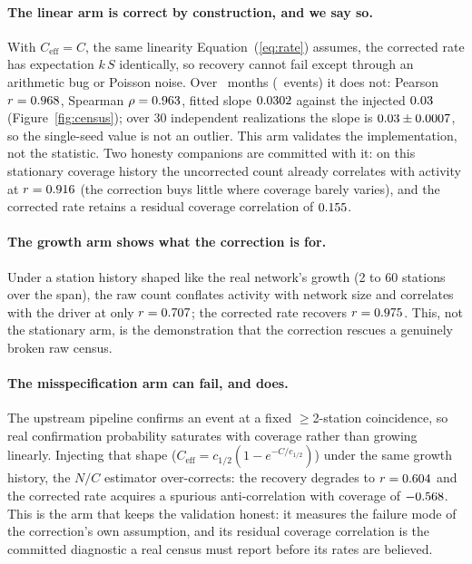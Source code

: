 \documentclass[twocolumn]{aastex631}
\begin{document}
\paragraph{The linear arm is correct by construction, and we say so.} With
$C_\mathrm{eff}=C$, the same linearity Equation~(\ref{eq:rate}) assumes, the corrected rate
has expectation $k\,S$ identically, so recovery cannot fail except through an arithmetic bug or
Poisson noise. Over \ecsSynNperiods\ months (\ecsSynNevents\ events) it does not: Pearson
$r=0.968$, Spearman $\rho=0.963$, fitted slope $0.0302$ against the
injected $0.03$ (Figure~\ref{fig:census}); over 30 independent realizations the slope is
$0.03\pm0.0007$, so the single-seed value is not an outlier. This arm
validates the implementation, not the statistic. Two honesty companions are committed with
it: on this stationary coverage history the uncorrected count already correlates with
activity at $r=0.916$ (the correction buys little where coverage barely varies), and
the corrected rate retains a residual coverage correlation of $0.155$.

\paragraph{The growth arm shows what the correction is for.} Under a station history shaped like
the real network's growth (2 to 60 stations over the span), the raw count conflates activity with
network size and correlates with the driver at only $r=0.707$; the corrected
rate recovers $r=0.975$. This, not the stationary arm, is the demonstration
that the correction rescues a genuinely broken raw census.

\paragraph{The misspecification arm can fail, and does.} The upstream pipeline confirms an event
at a fixed $\geq$2-station coincidence, so real confirmation probability saturates with coverage
rather than growing linearly. Injecting that shape
($C_\mathrm{eff}=c_{1/2}(1-e^{-C/c_{1/2}})$) under the same growth history, the $N/C$ estimator
over-corrects: the recovery degrades to $r=0.604$ and the corrected rate acquires a
spurious anti-correlation with coverage of $-0.568$. This is the arm that keeps
the validation honest: it measures the failure mode of the correction's own assumption, and its
residual coverage correlation is the committed diagnostic a real census must report before its
rates are believed.
\end{document}
